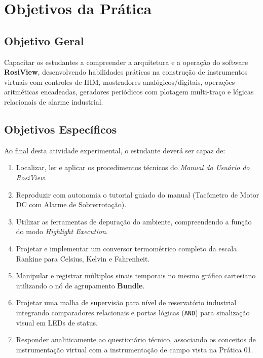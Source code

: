 \documentclass[11pt,a4paper]{article}
\begin{document}
\vspace{-0.2cm}

\section{Objetivos da Prática}

\subsection{Objetivo Geral}
Capacitar os estudantes a compreender a arquitetura e a operação do software \textbf{RosiView}, desenvolvendo habilidades práticas na construção de instrumentos virtuais com controles de IHM, mostradores analógicos/digitais, operações aritméticas encadeadas, geradores periódicos com plotagem multi-traço e lógicas relacionais de alarme industrial.

\subsection{Objetivos Específicos}
Ao final desta atividade experimental, o estudante deverá ser capaz de:
\begin{enumerate}
    \item Localizar, ler e aplicar os procedimentos técnicos do \textit{Manual do Usuário do RosiView}.
    \item Reproduzir com autonomia o tutorial guiado do manual (Tacômetro de Motor DC com Alarme de Sobrerrotação).
    \item Utilizar as ferramentas de depuração do ambiente, compreendendo a função do modo \textit{Highlight Execution}.
    \item Projetar e implementar um conversor termométrico completo da escala Rankine para Celsius, Kelvin e Fahrenheit.
    \item Manipular e registrar múltiplos sinais temporais no mesmo gráfico cartesiano utilizando o nó de agrupamento \textbf{Bundle}.
    \item Projetar uma malha de supervisão para nível de reservatório industrial integrando comparadores relacionais e portas lógicas (\texttt{AND}) para sinalização visual em LEDs de status.
    \item Responder analiticamente ao questionário técnico, associando os conceitos de instrumentação virtual com a instrumentação de campo vista na Prática 01.
\end{enumerate}
\end{document}

